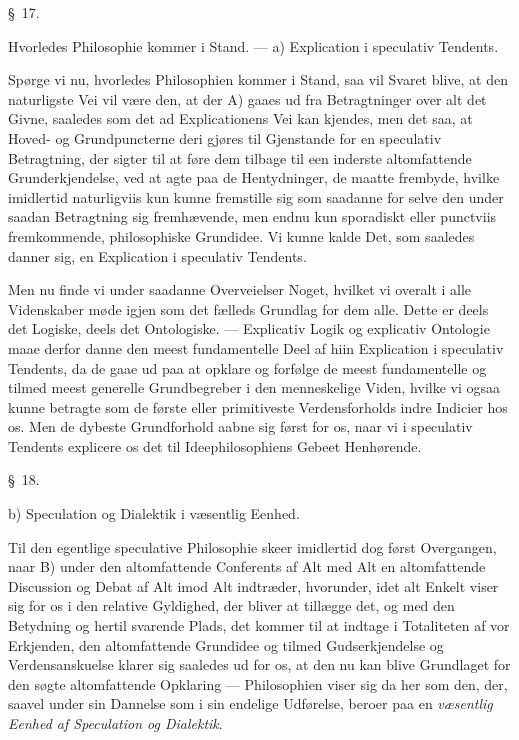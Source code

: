 \documentclass[12pt,a4paper]{book}
\newcommand{\apage}[1]{\marginnote{\footnotesize\textit{[#1]}}}
\begin{document}
\begin{center}\large\S~17.\end{center}
\begin{center}Hvorledes Philosophie kommer i Stand. --- a) Explication i
speculativ Tendents.\end{center}

Spørge vi nu, hvorledes Philosophien kommer i Stand, saa vil Svaret blive, at den
naturligste Vei vil være den, at der A) gaaes ud fra Betragtninger over alt det
Givne,  \apage{67} saaledes som det ad Explicationens Vei kan kjendes, men det saa, at Hoved- og
Grundpuncterne deri gjøres til Gjenstande for en speculativ Betragtning, der sigter
til at føre dem tilbage til een inderste altomfattende Grunderkjendelse, ved at agte
paa de Hentydninger, de maatte frembyde, hvilke imidlertid naturligviis kun kunne
fremstille sig som saadanne for selve den under saadan Betragtning sig fremhævende,
men endnu kun sporadiskt eller punctviis fremkommende, philosophiske Grundidee. Vi
kunne kalde Det, som saaledes danner sig, en Explication i speculativ Tendents.

Men nu finde vi under saadanne Overveielser Noget, hvilket vi overalt i alle
Videnskaber møde igjen som det fælleds Grundlag for dem alle. Dette er deels det
Logiske, deels det Ontologiske. --- Explicativ Logik og explicativ Ontologie maae
derfor danne den meest fundamentelle Deel af hiin Explication i speculativ Tendents,
da de gaae ud paa at opklare og forfølge de meest fundamentelle og tilmed meest
generelle Grundbegreber i den menneskelige Viden, hvilke vi ogsaa kunne betragte som
de første eller primitiveste Verdensforholds indre Indicier hos os. Men de dybeste
Grundforhold aabne sig først for os, naar vi i speculativ Tendents explicere os det
til Ideephilosophiens Gebeet Henhørende.

\begin{center}\large\S~18.\end{center}
\begin{center}b) Speculation og Dialektik i væsentlig Eenhed.\end{center}

Til den egentlige speculative Philosophie skeer imidlertid dog først Overgangen,
naar B) under den altomfattende Conferents af Alt med Alt en altomfattende
Discussion og Debat af Alt imod Alt indtræder, hvorunder, idet alt Enkelt viser sig
for os i den relative Gyldighed, der bliver at tillægge det, og med den Betydning og
hertil svarende Plads, det kommer til at indtage i Totaliteten af \apage{68}  vor Erkjenden, den
altomfattende Grundidee og tilmed Gudserkjendelse og Verdensanskuelse klarer sig
saaledes ud for os, at den nu kan blive Grundlaget for den søgte altomfattende
Opklaring --- Philosophien viser sig da her som den, der, saavel under sin Dannelse
som i sin endelige Udførelse, beroer paa en \emph{væsentlig Eenhed af Speculation og
Dialektik}.
\end{document}
